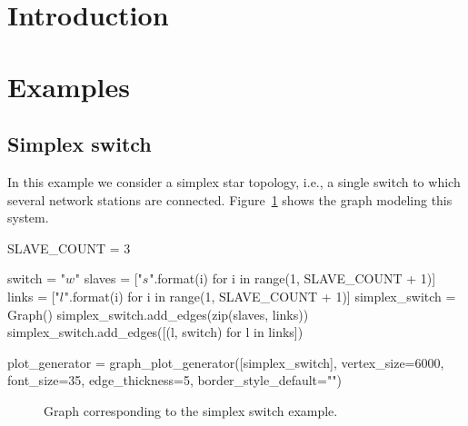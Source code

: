 \documentclass[times,a4paper,10pt,twocolumn]{article}
\theoremstyle{definition}
\theoremstyle{definition}
\theoremstyle{plain}
\begin{document}
\begin{abstract}

\end{abstract}







\section{Introduction}

\section{Examples}
\label{sec:Examples}


\subsection{Simplex switch}

In this example we consider a simplex star topology, i.e., a single switch to
which several network stations are connected. Figure~\ref{fig:simplex-switch}
shows the graph modeling this system.


\begin{sagesilent}

SLAVE_COUNT = 3

switch = "$w_{}$"
slaves = ["$s_{}$".format(i) for i in range(1, SLAVE_COUNT + 1)]
links = ["$l_{}$".format(i) for i in range(1, SLAVE_COUNT + 1)]
simplex_switch = Graph()
simplex_switch.add_edges(zip(slaves, links))
simplex_switch.add_edges([(l, switch) for l in links])

plot_generator = graph_plot_generator([simplex_switch], vertex_size=6000,
    font_size=35, edge_thickness=5, border_style_default="")
\end{sagesilent}

\begin{figure}
\centering
{}
\caption{Graph corresponding to the simplex switch example.}
\label{fig:simplex-switch}
\end{figure}

\sagetexpause
\end{document}
